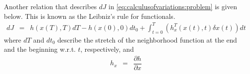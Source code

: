 Another relation that describes $dJ$ in \eqref{eq:calculusofvariations:problem} is given below. This is known as the Leibniz's rule for functionals.
\begin{eqnarray}
	dJ &=& h\left(x(T), T\right)dT - h\left(x(0), 0\right)dt_0 + \int_{t=0}^{T}\left(h_x^T\left(x(t), t\right)\delta x(t)\right)dt \nonumber
 \end{eqnarray}
where $dT$ and $dt_0$ describe the stretch of the neighborhood function at the end and the beginning w.r.t. $t$, respectively, and 
\begin{eqnarray}
	h_x &=& \dfrac{\partial h}{\partial x} \nonumber
\end{eqnarray} 






